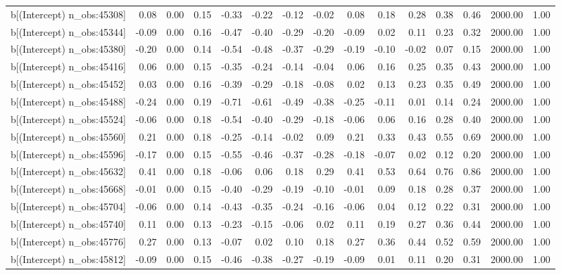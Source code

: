 \begin{table}[ht]
\begin{tabular}{rrrrrrrrrrrrrrr}
  b[(Intercept) n\_obs:45308] & 0.08 & 0.00 & 0.15 & -0.33 & -0.22 & -0.12 & -0.02 & 0.08 & 0.18 & 0.28 & 0.38 & 0.46 & 2000.00 & 1.00 \\ 
  b[(Intercept) n\_obs:45344] & -0.09 & 0.00 & 0.16 & -0.47 & -0.40 & -0.29 & -0.20 & -0.09 & 0.02 & 0.11 & 0.23 & 0.32 & 2000.00 & 1.00 \\ 
  b[(Intercept) n\_obs:45380] & -0.20 & 0.00 & 0.14 & -0.54 & -0.48 & -0.37 & -0.29 & -0.19 & -0.10 & -0.02 & 0.07 & 0.15 & 2000.00 & 1.00 \\ 
  b[(Intercept) n\_obs:45416] & 0.06 & 0.00 & 0.15 & -0.35 & -0.24 & -0.14 & -0.04 & 0.06 & 0.16 & 0.25 & 0.35 & 0.43 & 2000.00 & 1.00 \\ 
  b[(Intercept) n\_obs:45452] & 0.03 & 0.00 & 0.16 & -0.39 & -0.29 & -0.18 & -0.08 & 0.02 & 0.13 & 0.23 & 0.35 & 0.49 & 2000.00 & 1.00 \\ 
  b[(Intercept) n\_obs:45488] & -0.24 & 0.00 & 0.19 & -0.71 & -0.61 & -0.49 & -0.38 & -0.25 & -0.11 & 0.01 & 0.14 & 0.24 & 2000.00 & 1.00 \\ 
  b[(Intercept) n\_obs:45524] & -0.06 & 0.00 & 0.18 & -0.54 & -0.40 & -0.29 & -0.18 & -0.06 & 0.06 & 0.16 & 0.28 & 0.40 & 2000.00 & 1.00 \\ 
  b[(Intercept) n\_obs:45560] & 0.21 & 0.00 & 0.18 & -0.25 & -0.14 & -0.02 & 0.09 & 0.21 & 0.33 & 0.43 & 0.55 & 0.69 & 2000.00 & 1.00 \\ 
  b[(Intercept) n\_obs:45596] & -0.17 & 0.00 & 0.15 & -0.55 & -0.46 & -0.37 & -0.28 & -0.18 & -0.07 & 0.02 & 0.12 & 0.20 & 2000.00 & 1.00 \\ 
  b[(Intercept) n\_obs:45632] & 0.41 & 0.00 & 0.18 & -0.06 & 0.06 & 0.18 & 0.29 & 0.41 & 0.53 & 0.64 & 0.76 & 0.86 & 2000.00 & 1.00 \\ 
  b[(Intercept) n\_obs:45668] & -0.01 & 0.00 & 0.15 & -0.40 & -0.29 & -0.19 & -0.10 & -0.01 & 0.09 & 0.18 & 0.28 & 0.37 & 2000.00 & 1.00 \\ 
  b[(Intercept) n\_obs:45704] & -0.06 & 0.00 & 0.14 & -0.43 & -0.35 & -0.24 & -0.16 & -0.06 & 0.04 & 0.12 & 0.22 & 0.31 & 2000.00 & 1.00 \\ 
  b[(Intercept) n\_obs:45740] & 0.11 & 0.00 & 0.13 & -0.23 & -0.15 & -0.06 & 0.02 & 0.11 & 0.19 & 0.27 & 0.36 & 0.44 & 2000.00 & 1.00 \\ 
  b[(Intercept) n\_obs:45776] & 0.27 & 0.00 & 0.13 & -0.07 & 0.02 & 0.10 & 0.18 & 0.27 & 0.36 & 0.44 & 0.52 & 0.59 & 2000.00 & 1.00 \\ 
  b[(Intercept) n\_obs:45812] & -0.09 & 0.00 & 0.15 & -0.46 & -0.38 & -0.27 & -0.19 & -0.09 & 0.01 & 0.11 & 0.20 & 0.31 & 2000.00 & 1.00 \\ 

\end{tabular}
\end{table}
